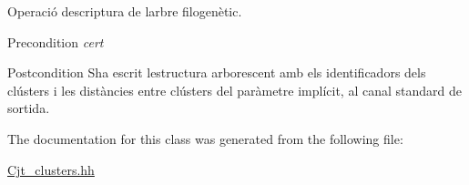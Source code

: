Operació d\textquotesingle{}escriptura de l\textquotesingle{}arbre filogenètic. 

\begin{DoxyPrecond}{Precondition}
{\itshape cert} 
\end{DoxyPrecond}
\begin{DoxyPostcond}{Postcondition}
S\textquotesingle{}ha escrit l\textquotesingle{}estructura arborescent amb els identificadors dels clústers i les distàncies entre clústers del paràmetre implícit, al canal standard de sortida. 
\end{DoxyPostcond}


The documentation for this class was generated from the following file\+:\begin{DoxyCompactItemize}
\item 
\hyperlink{_cjt__clusters_8hh}{Cjt\+\_\+clusters.\+hh}\end{DoxyCompactItemize}
